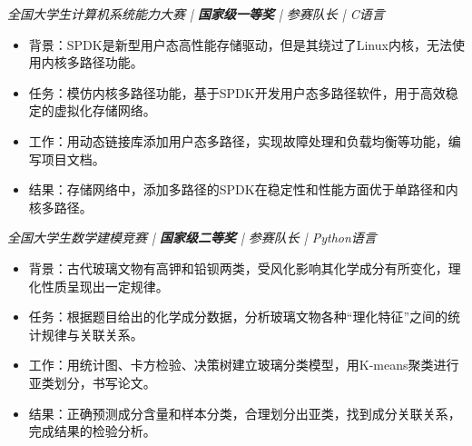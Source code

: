 \textit{全国大学生计算机系统能力大赛 | \textbf{国家级一等奖} | 参赛队长 | C语言}
\begin{itemize}
  \item 背景：SPDK是新型用户态高性能存储驱动，但是其绕过了Linux内核，无法使用内核多路径功能。
  \item 任务：模仿内核多路径功能，基于SPDK开发用户态多路径软件，用于高效稳定的虚拟化存储网络。
  \item 工作：用动态链接库添加用户态多路径，实现故障处理和负载均衡等功能，编写项目文档。
  \item 结果：存储网络中，添加多路径的SPDK在稳定性和性能方面优于单路径和内核多路径。
\end{itemize}
\textit{全国大学生数学建模竞赛 | \textbf{国家级二等奖} | 参赛队长 | Python语言}
\begin{itemize}
  \item 背景：古代玻璃文物有高钾和铅钡两类，受风化影响其化学成分有所变化，理化性质呈现出一定规律。
  \item 任务：根据题目给出的化学成分数据，分析玻璃文物各种“理化特征”之间的统计规律与关联关系。
  \item 工作：用统计图、卡方检验、决策树建立玻璃分类模型，用K-means聚类进行亚类划分，书写论文。
  \item 结果：正确预测成分含量和样本分类，合理划分出亚类，找到成分关联关系，完成结果的检验分析。
\end{itemize}
